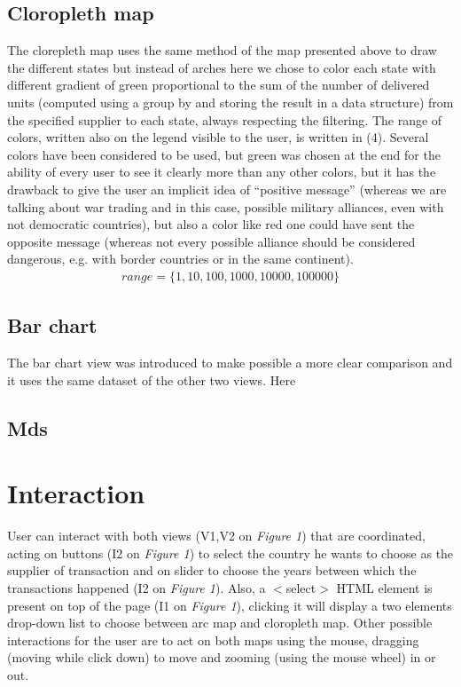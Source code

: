 \documentclass{article}
\begin{document}
\begin{multicols}{2}
\subsection{Cloropleth map}
The clorepleth map uses the same method of the map presented above to draw the different states but instead of arches here we chose to color each state with different gradient of green proportional to the sum of the number of delivered units (computed using a group by and storing the result in a data structure) from the specified supplier to each state, always respecting the filtering. The range of colors, written also on the legend visible to the user, is written in (4). Several colors have been considered to be used, but green was chosen at the end for the ability of every user to see it clearly more than any other colors, but it has the drawback to give the user an implicit idea of “positive message” (whereas we are talking about war trading and in this case, possible military alliances, even with not democratic countries), but also a color like red one could have sent the opposite message (whereas not every possible alliance should be considered dangerous, e.g. with border countries or in the same continent).
\begin{align}
	range=\{1,10,100,1000,10000,100000\}
\end{align}


\subsection{Bar chart}

The bar chart view was introduced to make possible a more clear comparison and it uses the same dataset of the other two views. Here 

\subsection{Mds}

\section{Interaction}
User can interact with both views (V1,V2 on \textit{Figure 1}) that are coordinated, acting on buttons (I2 on \textit{Figure 1}) to select the country he wants to choose as the supplier of transaction and on slider to choose the years between which the transactions happened (I2 on \textit{Figure 1}). Also, a $<$select$>$ HTML element is present on top of the page (I1 on \textit{Figure 1}), clicking it will display a two elements drop-down list to choose between arc map and cloropleth map. Other possible interactions for the user are  to act on both maps using the mouse, dragging (moving while click down) to move and zooming (using the mouse wheel) in or out. 




\end{multicols}
\end{document}
